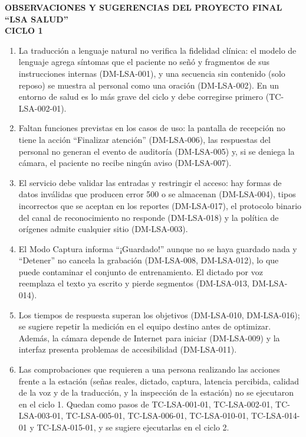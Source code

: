 \documentclass[10pt,a4paper]{article}
\begin{document}
\begin{center}
  \textbf{OBSERVACIONES Y SUGERENCIAS DEL PROYECTO FINAL ``LSA SALUD''\\ CICLO 1}
\end{center}

\vspace{0.5em}

\begin{enumerate}
  \item La traducción a lenguaje natural no verifica la fidelidad clínica: el modelo de lenguaje
    agrega síntomas que el paciente no señó y fragmentos de sus instrucciones internas
    (\mbox{DM-LSA-001}), y una secuencia sin contenido (solo reposo) se muestra al personal como
    una oración (\mbox{DM-LSA-002}). En un entorno de salud es lo más grave del ciclo y debe
    corregirse primero (\mbox{TC-LSA-002-01}).
  \item Faltan funciones previstas en los casos de uso: la pantalla de recepción no tiene la acción
    ``Finalizar atención'' (\mbox{DM-LSA-006}), las respuestas del personal no generan el evento
    de auditoría (\mbox{DM-LSA-005}) y, si se deniega la cámara, el paciente no recibe ningún aviso
    (\mbox{DM-LSA-007}).
  \item El servicio debe validar las entradas y restringir el acceso: hay formas de datos
    inválidas que producen error 500 o se almacenan (\mbox{DM-LSA-004}), tipos incorrectos que se
    aceptan en los reportes (\mbox{DM-LSA-017}), el protocolo binario del canal de reconocimiento
    no responde (\mbox{DM-LSA-018}) y la política de orígenes admite cualquier sitio
    (\mbox{DM-LSA-003}).
  \item El Modo Captura informa ``¡Guardado!'' aunque no se haya guardado nada y ``Detener'' no
    cancela la grabación (\mbox{DM-LSA-008}, \mbox{DM-LSA-012}), lo que puede contaminar el conjunto
    de entrenamiento. El dictado por voz reemplaza el texto ya escrito y pierde segmentos
    (\mbox{DM-LSA-013}, \mbox{DM-LSA-014}).
  \item Los tiempos de respuesta superan los objetivos (\mbox{DM-LSA-010}, \mbox{DM-LSA-016}); se
    sugiere repetir la medición en el equipo destino antes de optimizar. Además, la cámara depende
    de Internet para iniciar (\mbox{DM-LSA-009}) y la interfaz presenta problemas de accesibilidad
    (\mbox{DM-LSA-011}).
  \item Las comprobaciones que requieren a una persona realizando las acciones frente a la
    estación (señas reales, dictado, captura, latencia percibida, calidad de la voz y de la
    traducción, y la inspección de la estación) no se ejecutaron en el ciclo 1. Quedan como
    pasos de \mbox{TC-LSA-001-01}, \mbox{TC-LSA-002-01}, \mbox{TC-LSA-003-01},
    \mbox{TC-LSA-005-01}, \mbox{TC-LSA-006-01}, \mbox{TC-LSA-010-01}, \mbox{TC-LSA-014-01} y
    \mbox{TC-LSA-015-01}, y se sugiere ejecutarlas en el ciclo 2.
\end{enumerate}
\end{document}
